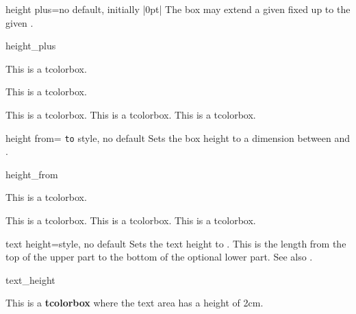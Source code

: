 \enlargethispage*{10mm}
\begin{docTcbKey}{height plus}{=}{no default, initially |0pt|}
  The box may extend a given fixed  up to the given .
\begin{exdispExample}{height_plus}

\begin{tcolorbox}[height=1cm]
This is a tcolorbox.
\end{tcolorbox}
\begin{tcolorbox}[height=1cm,height plus=1cm]
This is a tcolorbox.
\end{tcolorbox}
\begin{tcolorbox}[height=1cm,height plus=1cm]
This is a tcolorbox. This is a tcolorbox. This is a tcolorbox.
\end{tcolorbox}
\end{exdispExample}
\end{docTcbKey}


\begin{docTcbKey}{height from}{= \texttt{to} }{style, no default}
  Sets the box height to a dimension between  and .
\begin{exdispExample}{height_from}

\begin{mybox}
This is a tcolorbox.
\end{mybox}
\begin{mybox}
This is a tcolorbox. This is a tcolorbox. This is a tcolorbox.
\end{mybox}
\begin{mybox}
\lipsum[2]
\end{mybox}
\end{exdispExample}
\end{docTcbKey}


\begin{docTcbKey}[][doc new=2014-10-31]{text height}{=}{style, no default}
  Sets the text height to . This is the length from the top
  of the upper part to the bottom of the optional lower part.
  See also .
\begin{exdispExample}{text_height}

\begin{tcolorbox}[text height=2cm]
This is a \textbf{tcolorbox} where the text area has a height of 2cm.
\end{tcolorbox}
\end{exdispExample}
\end{docTcbKey}

